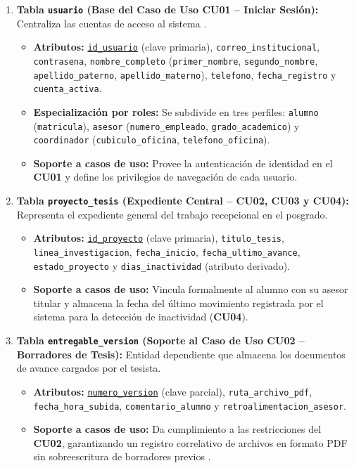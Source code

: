 \begin{enumerate}
    \item \textbf{Tabla \texttt{usuario} (Base del Caso de Uso CU01 -- Iniciar Sesión):}
    Centraliza las cuentas de acceso al sistema \parencite{ferraiolo2007}.
    \begin{itemize}
        \item \textbf{Atributos:} \underline{\texttt{id\_usuario}} (clave primaria), \texttt{correo\_institucional}, \texttt{contrasena}, \texttt{nombre\_completo} (\texttt{primer\_nombre}, \texttt{segundo\_nombre}, \texttt{apellido\_paterno}, \texttt{apellido\_materno}), \texttt{telefono}, \texttt{fecha\_registro} y \texttt{cuenta\_activa}.
        \item \textbf{Especialización por roles:} Se subdivide en tres perfiles: \texttt{alumno} (\texttt{matricula}), \texttt{asesor} (\texttt{numero\_empleado}, \texttt{grado\_academico}) y \texttt{coordinador} (\texttt{cubiculo\_oficina}, \texttt{telefono\_oficina}).
        \item \textbf{Soporte a casos de uso:} Provee la autenticación de identidad en el \textbf{CU01} y define los privilegios de navegación de cada usuario.
    \end{itemize}

    \item \textbf{Tabla \texttt{proyecto\_tesis} (Expediente Central -- CU02, CU03 y CU04):}
    Representa el expediente general del trabajo recepcional en el posgrado.
    \begin{itemize}
        \item \textbf{Atributos:} \underline{\texttt{id\_proyecto}} (clave primaria), \texttt{titulo\_tesis}, \texttt{linea\_investigacion}, \texttt{fecha\_inicio}, \texttt{fecha\_ultimo\_avance}, \texttt{estado\_proyecto} y \texttt{dias\_inactividad} (atributo derivado).
        \item \textbf{Soporte a casos de uso:} Vincula formalmente al alumno con su asesor titular y almacena la fecha del último movimiento registrada por el sistema para la detección de inactividad (\textbf{CU04}).
    \end{itemize}

    \item \textbf{Tabla \texttt{entregable\_version} (Soporte al Caso de Uso CU02 -- Borradores de Tesis):}
    Entidad dependiente que almacena los documentos de avance cargados por el tesista.
    \begin{itemize}
        \item \textbf{Atributos:} \underline{\texttt{numero\_version}} (clave parcial), \texttt{ruta\_archivo\_pdf}, \texttt{fecha\_hora\_subida}, \texttt{comentario\_alumno} y \texttt{retroalimentacion\_asesor}.
        \item \textbf{Soporte a casos de uso:} Da cumplimiento a las restricciones del \textbf{CU02}, garantizando un registro correlativo de archivos en formato PDF sin sobreescritura de borradores previos \parencite{chacon2014progit}.
    \end{itemize}


\end{enumerate}
